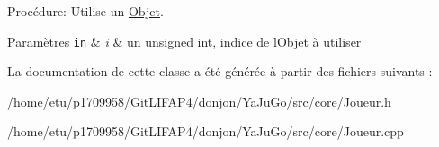 Procédure\+: Utilise un \mbox{\hyperlink{structObjet}{Objet}}. 


\begin{DoxyParams}[1]{Paramètres}
\mbox{\tt in}  & {\em i} & un unsigned int, indice de l\textquotesingle{}\mbox{\hyperlink{structObjet}{Objet}} à utiliser \\
\hline
\end{DoxyParams}


La documentation de cette classe a été générée à partir des fichiers suivants \+:\begin{DoxyCompactItemize}
\item 
/home/etu/p1709958/\+Git\+L\+I\+F\+A\+P4/donjon/\+Ya\+Ju\+Go/src/core/\mbox{\hyperlink{Joueur_8h}{Joueur.\+h}}\item 
/home/etu/p1709958/\+Git\+L\+I\+F\+A\+P4/donjon/\+Ya\+Ju\+Go/src/core/Joueur.\+cpp\end{DoxyCompactItemize}

